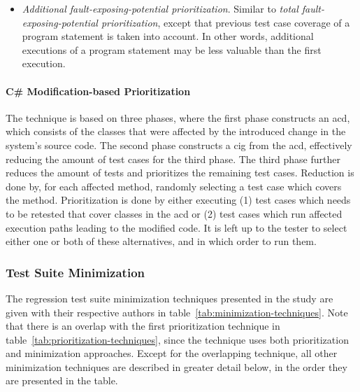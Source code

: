 \documentclass[a4paper,english,12pt]{report}
\begin{document}
\begin{itemize}
  \item\textit{Additional fault-exposing-potential prioritization}. Similar to \textit{total fault-exposing-potential prioritization}, except that previous test case coverage of a program statement is taken into account. In other words, additional executions of a program statement may be less valuable than the first execution.
\end{itemize}

\paragraph{C\# Modification-based Prioritization \citep{mansour2009regression}}
The technique is based on three phases, where the first phase constructs an \gls{acd}, which consists of the classes that were affected by the introduced change in the system's source code. The second phase constructs a \gls{cig} from the \gls{acd}, effectively reducing the amount of test cases for the third phase. The third phase further reduces the amount of tests and prioritizes the remaining test cases. Reduction is done by, for each affected method, randomly selecting a test case which covers the method. Prioritization is done by either executing (1) test cases which needs to be retested that cover classes in the \gls{acd} or (2) test cases which run affected execution paths leading to the modified code. It is left up to the tester to select either one or both of these alternatives, and in which order to run them. \citep{mansour2009regression}

\subsubsection{Test Suite Minimization}
The regression test suite minimization techniques presented in the study are given with their respective authors in table~\vref{tab:minimization-techniques}. Note that there is an overlap with the first prioritization technique in table~\ref{tab:prioritization-techniques}, since the technique uses both prioritization and minimization approaches. Except for the overlapping technique, all other minimization techniques are described in greater detail below, in the order they are presented in the table.
\end{document}
